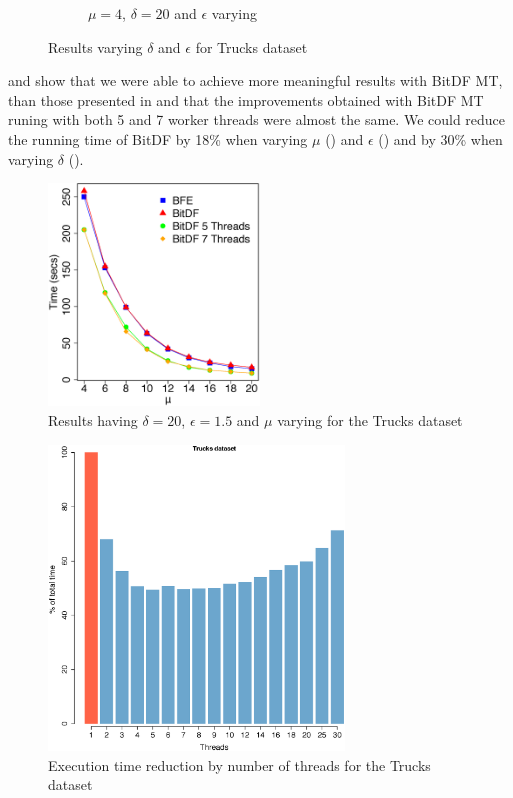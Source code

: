 {\begin{figure}[h!]
\begin{subfigure}[t]{0.49\textwidth}
        \caption{$\mu = 4$, $\delta = 20$ and $\epsilon$ varying}
        \label{fig:trucks_complete_vary_g}
    \end{subfigure}
    \caption{Results varying $\delta$ and $\epsilon$ for Trucks dataset}
    \label{fig:trucks_complete_results}
\end{figure}

 and  show that we were able to achieve more
meaningful results with BitDF MT, than those presented in  and that the improvements obtained with
BitDF MT runing with both 5 and 7 worker threads were almost the same. We could reduce the running time of BitDF by 18\%
when varying $\mu$ () and $\epsilon$ () and by
30\% when varying $\delta$ ().

\begin{figure}[h!]
    \centering
    \includegraphics[width=0.5\textwidth]{images/Trucks_complete_varying_n.eps}
    \caption{Results having $\delta = 20$, $\epsilon = 1.5$ and $\mu$ varying for the Trucks dataset}
    \label{fig:trucks_complete_vary_n}
\end{figure}

\begin{figure}[h!]
    \centering
    \includegraphics[width=0.7\textwidth]{images/Trucks_thread.eps}
    \caption{Execution time reduction by number of threads for the Trucks dataset}
    \label{fig:trucks_threads}
\end{figure}

}
